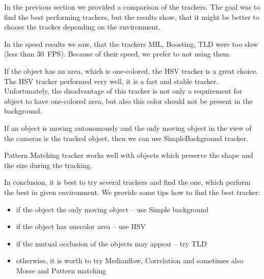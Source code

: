 In the previous section we provided a comparison of the trackers. The goal was
to find the best performing trackers, but the results show, that it might be
better to choose the tracker depending on the environment.

In the speed results we saw, that the trackers MIL, Boosting, TLD were too slow
(less than 30~FPS). Because of their speed, we prefer to not using them.

If the object has an area, which is one-colored, the HSV tracker is a great choice.
The HSV tracker performed very well, it is a fast and stable tracker.
Unfortunately, the disadvantage of this tracker is not only a requirement for
object to have one-colored area, but also this color should not be present in
the background.

If an object is moving autonomously and the only moving object in the view of
the cameras is the tracked object, then we can use SimpleBackground tracker.

Pattern Matching tracker works well with objects which preserve the shape
and the size during the tracking.

In conclusion, it is best to try several trackers and find the one, which
perform the best in given environment. We provide some tips how to find the
best tracker:
\begin{itemize}
\item if the object the only moving object -- use Simple background
\item if the object has onecolor area -- use HSV
\item if the mutual occlusion of the objects may appear -- try TLD
\item otherwise, it is worth to try Medianflow, Correlation and sometimes also Mosse and Pattern matching
\end{itemize}


